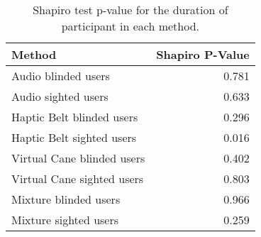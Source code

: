 
\begin{table}[!htb]
\centering
\caption{Shapiro test p-value for the duration of participant in each method.}
\label{tab:shapiro_duration}
\begin{tabular}{lr}
\toprule
                    Method &  Shapiro P-Value \\
\midrule
       Audio blinded users &            0.781 \\
       Audio sighted users &            0.633 \\
 Haptic Belt blinded users &            0.296 \\
 Haptic Belt sighted users &            0.016 \\
Virtual Cane blinded users &            0.402 \\
Virtual Cane sighted users &            0.803 \\
     Mixture blinded users &            0.966 \\
     Mixture sighted users &            0.259 \\
\bottomrule
\end{tabular}
\end{table}

